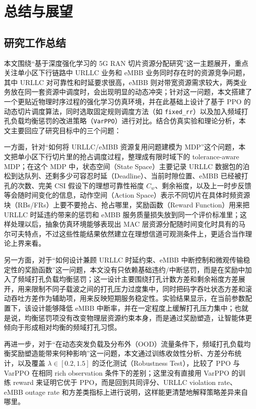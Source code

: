 \chapter{总结与展望}\label{ux4e94ux603bux7ed3ux4e0eux5c55ux671b}

\section{研究工作总结}\label{51-ux7814ux7a76ux5de5ux4f5cux603bux7ed3}

本文围绕``基于深度强化学习的 5G RAN 切片资源分配研究''这一主题展开，重点关注单小区下行链路中 URLLC 业务和 eMBB 业务同时存在时的资源竞争问题，其中 URLLC 对可靠性和时延要求很高，eMBB 则对带宽资源需求较大，两类业务放在同一套资源中调度时，会出现明显的动态冲突；针对这一问题，本文搭建了一个更贴近物理时序过程的强化学习仿真环境，并在此基础上设计了基于 PPO 的动态切片调度算法，同时选取固定规则调度方法（如 \texttt{fixed\_rr}）以及加入频域打孔负载均衡惩罚的改进策略（\texttt{VarPPO}）进行对比。结合仿真实验和理论分析，本文主要回应了研究目标中的三个问题：

一方面，针对``如何将 URLLC/eMBB 资源复用问题建模为 MDP''这个问题，本文把单小区下行切片里的抢占调度过程，整理成有限时域下的 tolerance-aware MDP；在这个 MDP 中，状态空间（State Space）主要记录 URLLC 数据包的泊松到达队列、还剩多少可容忍时延（Deadline）、当前时隙位置、eMBB 已经被打孔的次数、完美 CSI 假设下的理想可靠性裕度 \(C_w\)、剩余裕度，以及上一时步反馈等会随时间变化的信息，动作空间（Action Space）表示不同切片在具体时频资源块（RBs/FRs）上要不要抢占、抢占哪里，奖励函数（Reward Function）用来把 URLLC 时延违约带来的惩罚和 eMBB 服务质量损失放到同一个评价标准里；这样处理以后，抽象仿真环境能够表现出 MAC 层资源分配随时间变化时具有的马尔可夫特点，不过这些性能结果依然建立在理想信道可观测条件上，更适合当作理论上界来看。

另一方面，对于``如何设计兼顾 URLLC 时延约束、eMBB 中断控制和微观传输稳定性的奖励函数''这一问题，本文没有只依赖基础违约/中断惩罚，而是在奖励中加入了频域打孔负载均衡惩罚；这一设计主要围绕打孔计数方差和剩余裕度方差展开，用来限制不同子载波之间的打孔压力过度集中，同时把码字吞吐状态方差和滚动吞吐方差作为辅助项，用来反映短期服务稳定性。实验结果显示，在当前参数配置下，该设计能够降低 eMBB 中断率，并在一定程度上缓解打孔压力集中；也就是说，均衡惩罚项没有改变物理层资源约束本身，而是通过奖励塑造，让智能体更倾向于形成相对均衡的频域打孔习惯。

再进一步，对于``在动态突发负载及分布外（OOD）流量条件下，频域打孔负载均衡奖励塑造能带来何种影响''这一问题，本文通过训练收敛性分析、方差分布统计，以及覆盖 \(\lambda \in [0.2, 1.5]\) 的泛化测试（Robustness Test），比较了 PPO 与 VarPPO 在相同 rich observation 条件下的差别；这里没有直接用 VarPPO 的训练 reward 来证明它优于 PPO，而是回到共同评分、URLLC violation rate、eMBB outage rate 和方差类指标上进行说明，这样能更清楚地解释策略差异来自哪里。

